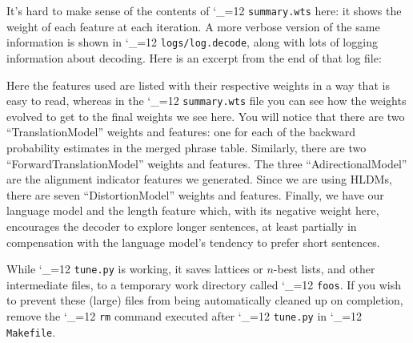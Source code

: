 \documentclass[11pt,letterpaper]{article}
\def\code{\begingroup\catcode`\_=12 \codex}
\newcommand{\codex}[1]{\texttt{#1}\endgroup}
\begin{document}
It's hard to make sense of the contents of \code{summary.wts} here: it shows
the weight of each feature at each iteration.  A more verbose version of the
same information is shown in \code{logs/log.decode}, along with lots of logging
information about decoding.  Here is an excerpt from the end of that log file:
Here the features used are listed with their respective weights in a way that
is easy to read, whereas in the \code{summary.wts} file you can see how the
weights evolved to get to the final weights we see here.
You will notice that there are two ``TranslationModel''
weights and features: one for each of the backward probability estimates in the
merged phrase table.  Similarly, there are two ``ForwardTranslationModel''
weights and features.  The three ``AdirectionalModel'' are the alignment
indicator features we generated.  Since we are using HLDMs, there are seven
``DistortionModel'' weights and features.  Finally, we have our language model
and the length feature which, with its negative weight here, encourages the
decoder to explore longer sentences, at least partially in compensation with
the language model's tendency to prefer short sentences.

While \code{tune.py} is working, it saves lattices or $n$-best lists, and other
intermediate files, to a temporary work directory called \code{foos}. If you
wish to prevent these (large) files from being automatically cleaned up on
completion, remove the \code{rm} command executed after \code{tune.py} in
\code{Makefile}.
\end{document}
